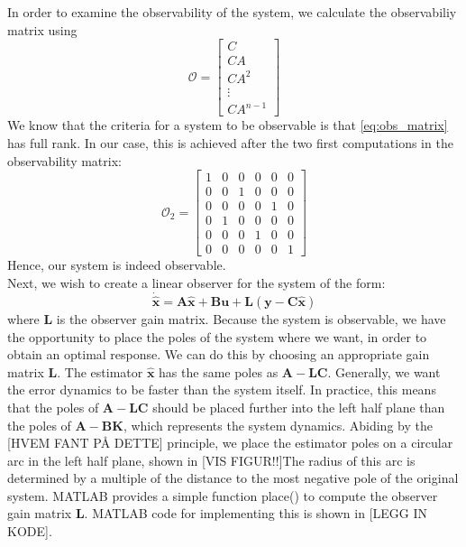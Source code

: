 In order to examine the observability of the system, we calculate the observabiliy matrix using
\begin{equation}\label{eq:obs_matrix}
    {\mathcal {O}}={\begin{bmatrix}C\\CA\\CA^{2}\\\vdots \\CA^{n-1}\end{bmatrix}}
\end{equation}
We know that the criteria for a system to be observable is that \eqref{eq:obs_matrix} has full rank. In our case, this is achieved after the two first computations in the observability matrix:
\begin{equation}\label{eq:obs_matrix_calc}
    {\mathcal {O}}_{2}=
    {\begin{bmatrix}
        1 & 0 & 0 & 0 & 0 & 0\\
        0 & 0 & 1 & 0 & 0 & 0\\
        0 & 0 & 0 & 0 & 1 & 0\\
        0 & 1 & 0 & 0 & 0 & 0\\
        0 & 0 & 0 & 1 & 0 & 0\\
        0 & 0 & 0 & 0 & 0 & 1
    \end{bmatrix}}
\end{equation}
Hence, our system is indeed observable.
\\Next, we wish to create a linear observer for the system of the form:
\begin{equation}\label{observer_system}
    \mathbf{\dot{\hat{x}} = A\hat{x} + Bu + L(y - C\hat{x})}
\end{equation}
where \textbf{L} is the observer gain matrix.
Because the system is observable, we have the opportunity to place the poles of the system where we want, in order to obtain an optimal response. We can do this by choosing an appropriate gain matrix \textbf{L}. The estimator $\mathbf{\hat{x}}$ has the same poles as $\mathbf{A - LC}$. Generally, we want the error dynamics to be faster than the system itself. In practice, this means that the poles of $\mathbf{A - LC}$ should be placed further into the left half plane than the poles of $\mathbf{A - BK}$, which represents the system dynamics. Abiding by the [HVEM FANT PÅ DETTE] principle, we place the estimator poles on a circular arc in the left half plane, shown in [VIS FIGUR!!]The radius of this arc is determined by a multiple of the distance to the most negative pole of the original system. MATLAB provides a simple function place() to compute the observer gain matrix \textbf{L}. MATLAB code for implementing this is shown in [LEGG IN KODE]. \\

